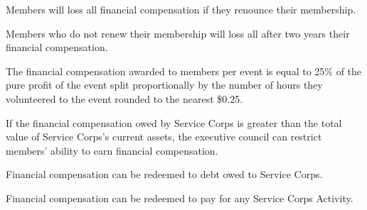 \documentclass{Service_Corps_Document}
\begin{document}
    \def \Title {Financial Compensation}
    \def \Company {Service Corps}
    \def \versionNumber {1.0}
    \stdFooter
    \begin{titlepage}
        \stdTitlePage
    \end{titlepage}

    \tableofcontents

    \newpage
    \item Members will loss all financial compensation if they renounce their membership.
    \item Members who do not renew their membership will loss all after two years their financial compensation.
    \item The financial compensation awarded to members per event is equal to 25\% of the pure profit of the event split proportionally by the number of hours they volunteered to the event rounded to the nearest \$0.25.
    \item If the financial compensation owed by Service Corps is greater than the total value of Service Corps's current assets, the executive council can restrict members' ability to earn financial compensation.
    \item Financial compensation can be redeemed to debt owed to Service Corps.
    \item Financial compensation can be redeemed to pay for any Service Corps Activity.
\end{document}
